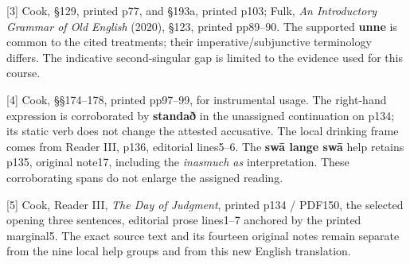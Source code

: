 [3] Cook, §129, printed p77, and §193a, printed p103; Fulk, \emph{An Introductory Grammar of Old English} (2020), §123, printed pp89–90. The supported \textbf{unne} is common to the cited treatments; their imperative/\allowbreak{}subjunctive terminology differs. The indicative second-singular gap is limited to the evidence used for this course.

[4] Cook, §§174–178, printed pp97–99, for instrumental usage. The right-hand expression is corroborated by \textbf{standað} in the unassigned continuation on p134; its static verb does not change the attested accusative. The local drinking frame comes from Reader III, p136, editorial lines5–6. The \textbf{swā lange swā} help retains p135, original note17, including the \emph{inasmuch as} interpretation. These corroborating spans do not enlarge the assigned reading.

[5] Cook, Reader III, \emph{The Day of Judgment}, printed p134 /\allowbreak{} PDF150, the selected opening three sentences, editorial prose lines1–7 anchored by the printed marginal5. The exact source text and its fourteen original notes remain separate from the nine local help groups and from this new English translation.

\endgroup

